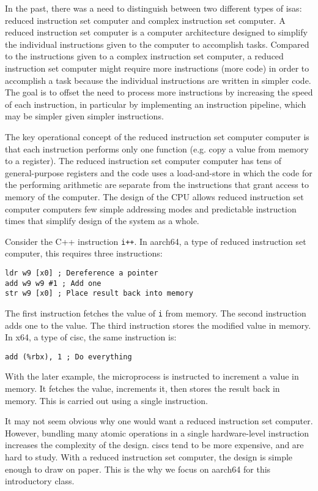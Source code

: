 \documentclass[letterpaper, 12pt]{book}
\begin{document}
In the past, there was a need to distinguish between two different types of \glspl{isa}: %
\gls{reduced instruction set computer} and  %
\gls{complex instruction set computer}. A \gls{reduced instruction set computer} is a computer 
architecture designed %
to simplify the individual instructions given to the computer to accomplish tasks. Compared to the 
instructions given to a \gls{complex instruction set computer}, a \gls{reduced instruction set computer} might require more 
instructions (more code) in order to accomplish a task because the individual instructions are written 
in simpler code. The goal is to offset the need to process more instructions by increasing the speed 
of each instruction, in particular by implementing an instruction pipeline, which may be simpler given 
simpler instructions.

The key operational concept of the \gls{reduced instruction set computer} computer is that each instruction performs only one function 
(e.g. copy a value from memory to a register). The \gls{reduced instruction set computer} computer has tens of general-purpose 
\glspl{register} and the code uses a \gls{load-and-store} in which the code for the performing
arithmetic are separate from the instructions that grant access to memory of the computer. 
The design of the CPU allows \gls{reduced instruction set computer} computers few simple addressing modes and predictable instruction times 
that simplify design of the system as a whole.

Consider the C++ instruction \texttt{i++}. In \gls{aarch64}, a type of \gls{reduced instruction set computer}, 
this requires three instructions:
%
\begin{verbatim}
ldr w9 [x0] ; Dereference a pointer
add w9 w9 #1 ; Add one
str w9 [x0] ; Place result back into memory
\end{verbatim}
%
The first instruction fetches the value of \texttt{i} from memory. The second instruction adds one to 
the value. The third instruction stores the modified value in memory. In \gls{x64}, a type of \gls{cisc},
the same instruction is:
\begin{verbatim}
add (%rbx), 1 ; Do everything
\end{verbatim}
%
With the later example, the microprocess is instructed to increment a value in memory. It fetches the 
value, increments it, then stores the result back in memory. This is carried out using a single instruction.

It may not seem obvious why one would want a \gls{reduced instruction set computer}. However, bundling many 
atomic operations in a single hardware-level instruction increases the complexity of the design. \glspl{cisc}
tend to be more expensive, and are hard to study. With a \gls{reduced instruction set computer}, the design 
is simple enough to draw on paper. This is the why we focus on \gls{aarch64} for this introductory class.
\end{document}
